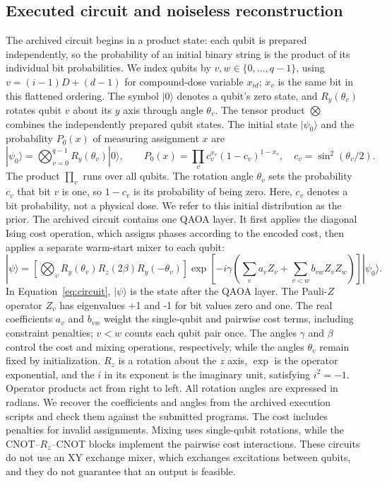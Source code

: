 \documentclass[utf8]{FrontiersinHarvard}
\begin{document}
\subsection{Executed circuit and noiseless reconstruction}
The archived circuit begins in a product state: each qubit is prepared independently, so the probability of an initial binary string is the product of its individual bit probabilities. We index qubits by $v,w\in\{0,\ldots,q-1\}$, using $v=(i-1)D+(d-1)$ for compound-dose variable $x_{id}$; $x_v$ is the same bit in this flattened ordering. The symbol $|0\rangle$ denotes a qubit's zero state, and $R_y(\theta_v)$ rotates qubit $v$ about its $y$ axis through angle $\theta_v$. The tensor product $\bigotimes$ combines the independently prepared qubit states. The initial state $|\psi_0\rangle$ and the probability $P_0(x)$ of measuring assignment $x$ are
\begin{equation}
 |\psi_0\rangle=\bigotimes_{v=0}^{q-1}R_y(\theta_v)|0\rangle,
 \qquad P_0(x)=\prod_v c_v^{x_v}(1-c_v)^{1-x_v},\quad
 c_v=\sin^2(\theta_v/2).
 \label{eq:prior}
\end{equation}
The product $\prod_v$ runs over all qubits. The rotation angle $\theta_v$ sets the probability $c_v$ that bit $v$ is one, so $1-c_v$ is its probability of being zero. Here, $c_v$ denotes a bit probability, not a physical dose. We refer to this initial distribution as the prior. The archived circuit contains one QAOA layer. It first applies the diagonal Ising cost operation, which assigns phases according to the encoded cost, then applies a separate warm-start mixer to each qubit:
\begin{equation}
 |\psi\rangle=\left[\bigotimes_v R_y(\theta_v)R_z(2\beta)R_y(-\theta_v)\right]
 \exp\!\left[-i\gamma\left(\sum_v a_vZ_v+\sum_{v<w}b_{vw}Z_vZ_w\right)\right]|\psi_0\rangle.
 \label{eq:circuit}
\end{equation}
In Equation~\ref{eq:circuit}, $|\psi\rangle$ is the state after the QAOA layer. The Pauli-$Z$ operator $Z_v$ has eigenvalues +1 and -1 for bit values zero and one. The real coefficients $a_v$ and $b_{vw}$ weight the single-qubit and pairwise cost terms, including constraint penalties; $v<w$ counts each qubit pair once. The angles $\gamma$ and $\beta$ control the cost and mixing operations, respectively, while the angles $\theta_v$ remain fixed by initialization. $R_z$ is a rotation about the $z$ axis, $\exp$ is the operator exponential, and the $i$ in its exponent is the imaginary unit, satisfying $i^2=-1$. Operator products act from right to left. All rotation angles are expressed in radians. We recover the coefficients and angles from the archived execution scripts and check them against the submitted programs. The cost includes penalties for invalid assignments. Mixing uses single-qubit rotations, while the CNOT--$R_z$--CNOT blocks implement the pairwise cost interactions. These circuits do not use an XY exchange mixer, which exchanges excitations between qubits, and they do not guarantee that an output is feasible.
\end{document}
